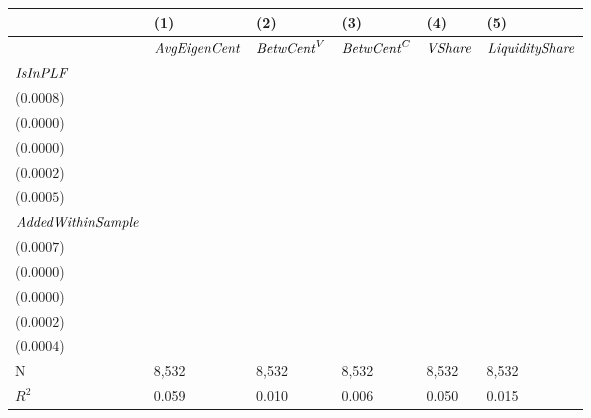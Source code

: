 \begin{tabular}{llllll}
\toprule
{} &                                       (1) &                                       (2) &                                       (3) &                                       (4) &                                       (5) \\
\midrule
                          &                      ${\it AvgEigenCent}$ &                        ${\it BetwCent}^V$ &                        ${\it BetwCent}^C$ &                            ${\it VShare}$ &                    ${\it LiquidityShare}$ \\
${\it IsInPLF}$           &  \makecell{$-0.0187^{***}$ \\ ($0.0008$)} &  \makecell{$-0.0001^{***}$ \\ ($0.0000$)} &  \makecell{$-0.0000^{***}$ \\ ($0.0000$)} &  \makecell{$-0.0040^{***}$ \\ ($0.0002$)} &  \makecell{$-0.0056^{***}$ \\ ($0.0005$)} \\
${\it AddedWithinSample}$ &   \makecell{$0.0259^{***}$ \\ ($0.0007$)} &   \makecell{$0.0002^{***}$ \\ ($0.0000$)} &   \makecell{$0.0001^{***}$ \\ ($0.0000$)} &   \makecell{$0.0061^{***}$ \\ ($0.0002$)} &   \makecell{$0.0100^{***}$ \\ ($0.0004$)} \\
\midrule N                &                                     8,532 &                                     8,532 &                                     8,532 &                                     8,532 &                                     8,532 \\
$R^2$                     &                                     0.059 &                                     0.010 &                                     0.006 &                                     0.050 &                                     0.015 \\
\bottomrule
\end{tabular}
